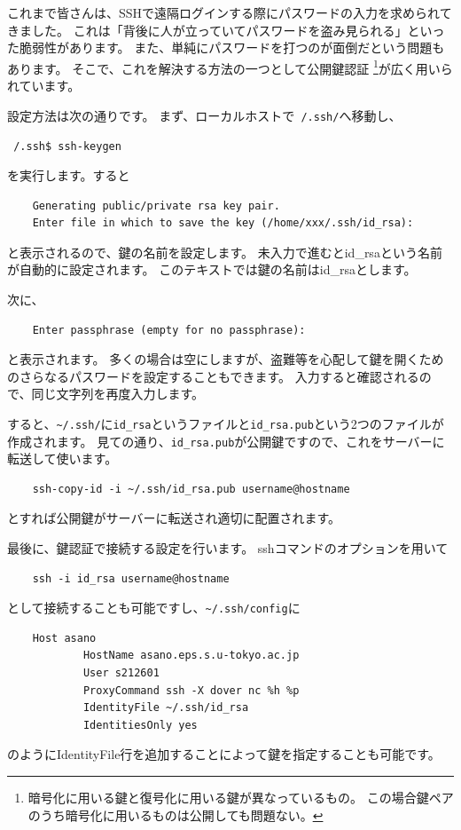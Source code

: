 \documentclass[a4j]{ltjsreport}
\begin{document}
    これまで皆さんは、SSHで遠隔ログインする際にパスワードの入力を求められてきました。
    これは「背後に人が立っていてパスワードを盗み見られる」といった脆弱性があります。
    また、単純にパスワードを打つのが面倒だという問題もあります。
    そこで、これを解決する方法の一つとして公開鍵認証
    \footnote{暗号化に用いる鍵と復号化に用いる鍵が異なっているもの。
    この場合鍵ペアのうち暗号化に用いるものは公開しても問題ない。}が広く用いられています。

    設定方法は次の通りです。
    まず、ローカルホストで\texttt{~/.ssh/}へ移動し、
    \begin{screen}
        \texttt{~/.ssh\$ ssh-keygen}
    \end{screen}
    を実行します。すると
    \begin{verbatim}
    Generating public/private rsa key pair.
    Enter file in which to save the key (/home/xxx/.ssh/id_rsa):
    \end{verbatim}
    と表示されるので、鍵の名前を設定します。
    未入力で進むとid\_rsaという名前が自動的に設定されます。
    このテキストでは鍵の名前はid\_rsaとします。

    次に、
    \begin{verbatim}
    Enter passphrase (empty for no passphrase):
    \end{verbatim}
    と表示されます。
    多くの場合は空にしますが、盗難等を心配して鍵を開くためのさらなるパスワードを設定することもできます。
    入力すると確認されるので、同じ文字列を再度入力します。

    すると、\verb|~/.ssh/|に\verb|id_rsa|というファイルと\verb|id_rsa.pub|という2つのファイルが作成されます。
    見ての通り、\verb|id_rsa.pub|が公開鍵ですので、これをサーバーに転送して使います。
    \begin{verbatim}
    ssh-copy-id -i ~/.ssh/id_rsa.pub username@hostname
    \end{verbatim}
    とすれば公開鍵がサーバーに転送され適切に配置されます。

    最後に、鍵認証で接続する設定を行います。
    sshコマンドのオプションを用いて
    \begin{verbatim}
    ssh -i id_rsa username@hostname
    \end{verbatim}
    として接続することも可能ですし、\verb|~/.ssh/config|に
    \begin{verbatim}
    Host asano
            HostName asano.eps.s.u-tokyo.ac.jp
            User s212601
            ProxyCommand ssh -X dover nc %h %p
            IdentityFile ~/.ssh/id_rsa
            IdentitiesOnly yes
    \end{verbatim}
    のようにIdentityFile行を追加することによって鍵を指定することも可能です。
\end{document}
